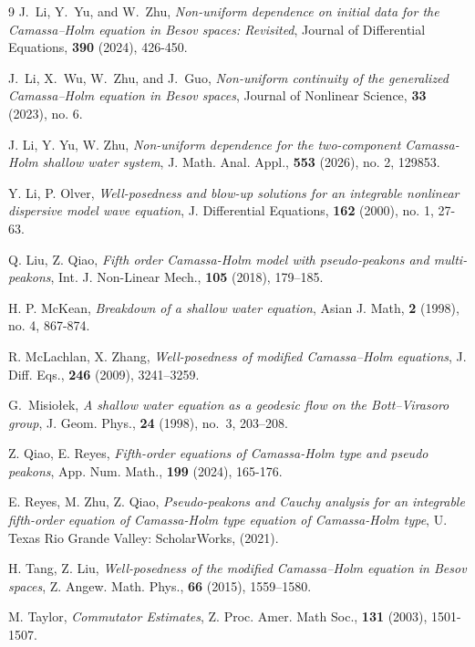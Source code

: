 \documentclass[reqno]{amsart}
\theoremstyle{plain}
\numberwithin{equation}{section}
\begin{document}
\begin{thebibliography}{9}
J.~Li, Y.~Yu, and W.~Zhu,
\newblock \textit{Non-uniform dependence on initial data for the Camassa–Holm equation in Besov spaces: Revisited},
\newblock Journal of Differential Equations, \textbf{390} (2024), 426-450.

J.~Li, X.~Wu, W.~Zhu, and J.~Guo,
\newblock \textit{Non-uniform continuity of the generalized Camassa–Holm equation in Besov spaces},
\newblock Journal of Nonlinear Science, \textbf{33} (2023), no. 6.

J. Li, Y. Yu, W. Zhu, \textit{Non-uniform dependence for the two-component Camassa-Holm shallow water system}, J. Math. Anal. Appl., \textbf{553} (2026), no. 2, 129853.

Y. Li, P. Olver, \textit{Well-posedness and blow-up solutions for an integrable nonlinear dispersive model wave equation}, J. Differential Equations, \textbf{162} (2000), no. 1, 27-63.

Q. Liu, Z. Qiao, \textit{Fifth order Camassa-Holm model with pseudo-peakons and multi-peakons}, Int. J. Non-Linear Mech., \textbf{105} (2018), 179–185.

H. P. McKean, \textit{Breakdown of a shallow water equation}, Asian J. Math, \textbf{2} (1998), no. 4, 867-874.

R. McLachlan, X. Zhang, \textit{Well-posedness of modified Camassa–Holm equations}, J. Diff. Eqs., \textbf{246} (2009), 3241–3259.

G.~Misiołek,
\textit{A shallow water equation as a geodesic flow on the Bott--Virasoro group},
J. Geom. Phys., \textbf{24} (1998), no.~3, 203--208.

Z. Qiao, E. Reyes, \textit{Fifth-order equations of Camassa-Holm type and pseudo peakons}, App. Num. Math., \textbf{199} (2024), 165-176.

E. Reyes, M. Zhu, Z. Qiao, \textit{Pseudo-peakons and Cauchy analysis for an integrable fifth-order
equation of Camassa-Holm type equation of Camassa-Holm type}, U. Texas Rio Grande Valley: ScholarWorks, (2021).
 

H. Tang, Z. Liu, \textit{Well-posedness of the modified Camassa–Holm equation in Besov spaces}, Z. Angew. Math. Phys., \textbf{66} (2015), 1559–1580.


M. Taylor, \textit{Commutator Estimates}, Z. Proc. Amer. Math Soc., \textbf{131} (2003), 1501-1507.



\end{thebibliography}
\end{document}

